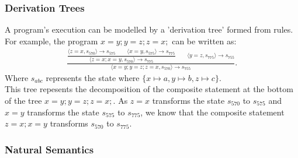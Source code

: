 \documentclass[a4paper, 12pt, twoside]{article}
\begin{document}
\subsubsection{Derivation Trees}

A program's execution can be modelled by a 'derivation tree'
formed from rules.
For example, the program $x=y;y=z;z=x;$ can be written as:
\begin{gather*}
  \frac{\dfrac{
    \langle z=x, s_{570} \rangle \to s_{575} 
    \qquad \langle x=y, s_{575} \rangle \to s_{775}
  }{\langle z=x;x=y, s_{570} \rangle \to s_{775}}
  \qquad \langle y=z, s_{775} \rangle \to s_{755}}
  {\langle x=y;y=z;z=x, s_{570} \rangle \to s_{755}}.
\end{gather*} Where $s_{abc}$ represents the state where 
$\{x \mapsto a, y \mapsto b, z \mapsto c\}$.
\\[\baselineskip]
This tree repesents the decomposition of the composite statement
at the bottom of the tree $x=y;y=z;z=x;$. As $z=x$ transforms
the state $s_{570}$ to $s_{575}$ and $x=y$ transforms the state
$s_{575}$ to $s_{775}$, we know that the composite statement
$z=x;x=y$ transforms $s_{570}$ to $s_{775}$.

\subsubsection{Natural Semantics}
\end{document}
